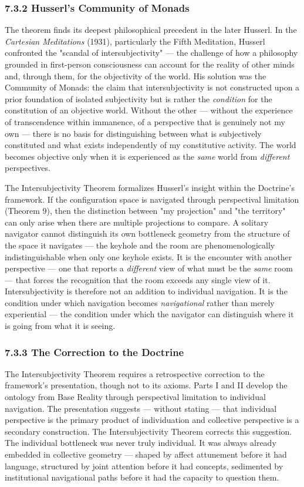 \subsubsection*{7.3.2 Husserl's Community of Monads}


The theorem finds its deepest philosophical precedent in the later Husserl. In the \textit{Cartesian Meditations} (1931), particularly the Fifth Meditation, Husserl confronted the "scandal of intersubjectivity" — the challenge of how a philosophy grounded in first-person consciousness can account for the reality of other minds and, through them, for the objectivity of the world. His solution was the Community of Monads: the claim that intersubjectivity is not constructed upon a prior foundation of isolated subjectivity but is rather the \textit{condition} for the constitution of an objective world. Without the other — without the experience of transcendence within immanence, of a perspective that is genuinely not my own — there is no basis for distinguishing between what is subjectively constituted and what exists independently of my constitutive activity. The world becomes objective only when it is experienced as the \textit{same} world from \textit{different} perspectives.


The Intersubjectivity Theorem formalizes Husserl's insight within the Doctrine's framework. If the configuration space is navigated through perspectival limitation (Theorem 9), then the distinction between "my projection" and "the territory" can only arise when there are multiple projections to compare. A solitary navigator cannot distinguish its own bottleneck geometry from the structure of the space it navigates — the keyhole and the room are phenomenologically indistinguishable when only one keyhole exists. It is the encounter with another perspective — one that reports a \textit{different} view of what must be the \textit{same} room — that forces the recognition that the room exceeds any single view of it. Intersubjectivity is therefore not an addition to individual navigation. It is the condition under which navigation becomes \textit{navigational} rather than merely experiential — the condition under which the navigator can distinguish where it is going from what it is seeing.


\subsubsection*{7.3.3 The Correction to the Doctrine}


The Intersubjectivity Theorem requires a retrospective correction to the framework's presentation, though not to its axioms. Parts I and II develop the ontology from Base Reality through perspectival limitation to individual navigation. The presentation suggests — without stating — that individual perspective is the primary product of individuation and collective perspective is a secondary construction. The Intersubjectivity Theorem corrects this suggestion. The individual bottleneck was never truly individual. It was always already embedded in collective geometry — shaped by affect attunement before it had language, structured by joint attention before it had concepts, sedimented by institutional navigational paths before it had the capacity to question them.



